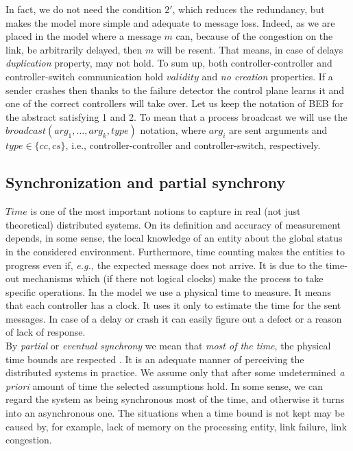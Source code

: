 \documentclass{article}
\theoremstyle{remark}
\begin{document}
In fact, we do not need the condition $2'$, which reduces the redundancy, but makes the model more simple and adequate to message loss. Indeed, as we are placed in the model where a message $m$ can, because of the congestion on the link, be arbitrarily delayed, then $m$ will be resent. That means, in case of delays \emph{duplication} property, may not hold.
To sum up, both controller-controller and controller-switch communication hold $validity$ and \emph{no creation} properties.
If a sender crashes then thanks to the failure detector the control plane learns it and one of the correct controllers will take over.
Let us keep the notation of BEB for the abstract satisfying 1 and 2. To mean that a process broadcast we will use the $broadcast(arg_1,\ldots,arg_k,type)$ notation, where $arg_i$ are sent arguments and $type\in\lbrace cc,cs\rbrace$, i.e., controller-controller and controller-switch, respectively.
\subsection{Synchronization and partial synchrony}
$Time$ is one of the most important notions to capture in real (not just theoretical) distributed systems. On its definition and accuracy of measurement depends, in some sense, the local knowledge of an entity about the global status in the considered environment. Furthermore, time counting makes the entities to progress even if, \emph{e.g., }the expected message does not arrive. It is due to the time-out mechanisms which (if there not logical clocks) make the process to take specific operations.
In the model we use a physical time to measure. It means that each controller has a clock. It uses it only to estimate the time for the sent messages. In case of a delay or crash it can easily figure out a defect or a reason of lack of response.\\
By \emph{partial} or \emph{eventual synchrony} we mean that \emph{most of the time}, the physical time bounds are respected \cite{Guerraoui:2010:IRD:1951643}. It is an adequate manner of perceiving the distributed systems in practice. We assume only that after some undetermined \emph{a priori} amount of time the selected assumptions hold. In some sense, we can regard the system as being synchronous most of the time, and otherwise it turns into an  asynchronous one.
The situations when a time bound is not kept may be caused by, for example, lack of memory on the processing entity, link failure, link congestion.
\end{document}
